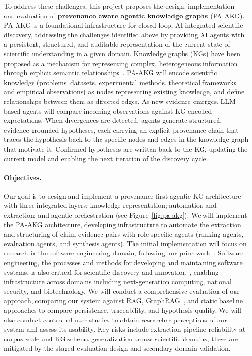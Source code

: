 \documentclass{files/proposalnsf}
\begin{document}

To address these challenges, this project proposes the design, implementation, and evaluation of \textbf{provenance-aware agentic knowledge graphs} (PA-AKG). PA-AKG is a foundational infrastructure for closed-loop, AI-integrated scientific discovery, addressing the challenges identified above by providing AI agents with a persistent, structured, and auditable representation of the current state of scientific understanding in a given domain. Knowledge graphs (KGs) have been proposed as a mechanism for representing complex, heterogeneous information through explicit semantic relationships~\cite{ding2026bridging,karras2024organizing}. PA-AKG will encode scientific knowledge (\ie problems, datasets, experimental methods, theoretical frameworks, and empirical observations) as nodes representing existing knowledge, and define relationships between them as directed edges. As new evidence emerges, LLM-based agents will compare incoming observations against KG-encoded expectations. When divergences are detected, agents generate structured, evidence-grounded hypotheses, each carrying an explicit provenance chain that traces the hypothesis back to the specific nodes and edges in the knowledge graph that motivate it. Confirmed hypotheses are written back to the KG, updating the current model and enabling the next iteration of the discovery cycle.

\paragraph{Objectives.} Our goal is to design and implement a provenance-first agentic KG architecture with three integrated layers: knowledge representation; automation and extraction; and agentic orchestration (see Figure~\ref{fig:pa-akg}). We will implement the PA-AKG architecture, developing infrastructure to automate the extraction and structuring of claim-evidence pairs with role-specific agents (\eg ranking agents, evaluation agents, and synthesis agents). The initial implementation will focus on research in the software engineering domain, following our prior work~\cite{cusati2026fose}. Software engineering, the processes and methods for developing and maintaining software systems, is also critical for scientific discovery and innovation~\cite{vos2026reclaiming}, enabling infrastructure across domains including next-generation computing, national security, and biotechnology. We will conduct a comprehensive evaluation of our approach, comparing our system against RAG, GraphRAG~\cite{Edge2024GraphRAG}, and static baseline approaches to compare persistence, traceability, and hypothesis quality. We will also conduct controlled user studies to obtain researcher perceptions of our system and assess its usability. Key risks include extraction pipeline reliability at corpus scale and KG schema generalization across scientific domains; these are mitigated by the staged evaluation design and secondary domain validation.
\end{document}
